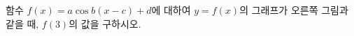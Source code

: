 \noindent\begin{minipage}[t]{0.58\linewidth}\vspace{0pt}\raggedright 함수 $f(x)=a\cos b(x-c)+d$에 대하여 $y=f(x)$의 그래프가 오른쪽 그림과 같을 때, $f(3)$의 값을 구하시오. \end{minipage}\hfill\begin{minipage}[t]{0.4\linewidth}\vspace{0pt}\centering \resizebox{\ifdim\width>\linewidth\linewidth\else\width\fi}{!}{}\end{minipage}\par

